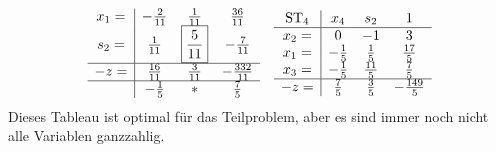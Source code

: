 \begin{exmp}
\[\begin{array}{c|ccc}
      x_1 = & -\frac{2}{11} & \frac{1}{11} & \frac{36}{11} \\
      s_2 = & \frac{1}{11} & \boxed{\frac{5}{11}} & - \frac{7}{11} \\
      \hline
      - z = & \frac{16}{11} & \frac{3}{11} & -\frac{332}{11} \\
      \hline
              & -\frac{1}{5} & \ast & \frac{7}{5}
    \end{array}
    \quad
    \begin{array}{c|ccc}
      \operatorname*{ST}_4 & x_4 & s_2 & 1 \\
      \hline
      x_2 = & 0 & -1 & 3 \\
      x_1 = & -\frac{1}{5} & \frac{1}{5} & \frac{17}{5} \\
      x_3 = & -\frac{1}{5} & \frac{11}{5} & \frac{7}{5} \\
      \hline
      - z = & \frac{7}{5} & \frac{3}{5} & -\frac{149}{5}
    \end{array}
  \]
  Dieses Tableau ist optimal für das Teilproblem, aber es sind immer noch
  nicht alle Variablen ganzzahlig.
  

\end{exmp}

